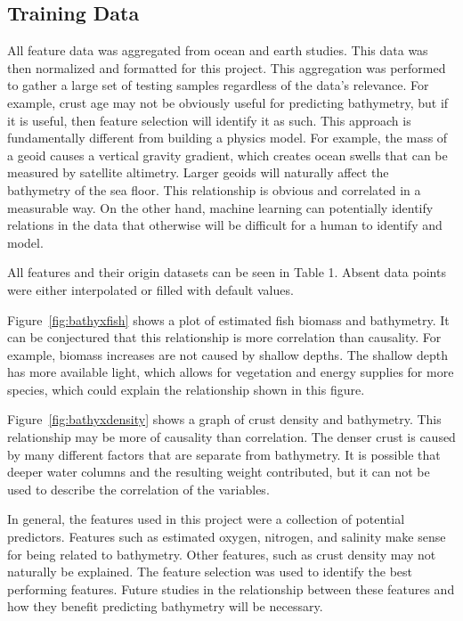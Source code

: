 \subsection{Training Data}
All feature data was aggregated from ocean and earth studies.
This data was then normalized and formatted for this project.
This aggregation was performed to gather a large set of testing samples regardless of the data's relevance.
For example, crust age may not be obviously useful for predicting bathymetry, but if it is useful, then feature selection will identify it as such.
This approach is fundamentally different from building a physics model.
For example, the mass of a geoid causes a vertical gravity gradient, which creates ocean swells that can be measured by satellite altimetry.
Larger geoids will naturally affect the bathymetry of the sea floor.
This relationship is obvious and correlated in a measurable way.
On the other hand, machine learning can potentially identify relations in the data that otherwise will be difficult for a human to identify and model.

All features and their origin datasets can be seen in Table 1. %
Absent data points were either interpolated or filled with default values.

\par
Figure~\ref{fig:bathyxfish} shows a plot of estimated fish biomass and bathymetry.
It can be conjectured that this relationship is more correlation than causality.
For example, biomass increases are not caused by shallow depths.
The shallow depth has more available light, which allows for vegetation and energy supplies for more species, which could explain the relationship shown in this figure.

\par
Figure~\ref{fig:bathyxdensity} shows a graph of crust density and bathymetry.
This relationship may be more of causality than correlation.
The denser crust is caused by many different factors that are separate from bathymetry.
It is possible that deeper water columns and the resulting weight contributed, but it can not be used to describe the correlation of the variables.

\par
In general, the features used in this project were a collection of potential predictors.
Features such as estimated oxygen, nitrogen, and salinity make sense for being related to bathymetry.
Other features, such as crust density may not naturally be explained.
The feature selection was used to identify the best performing features.
Future studies in the relationship between these features and how they benefit predicting bathymetry will be necessary.

